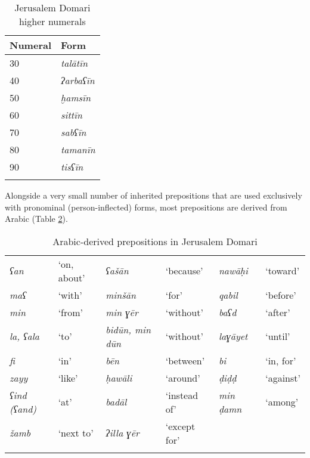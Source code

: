 \documentclass[output=paper]{langsci/langscibook}
\begin{document}
\begin{table}[]
\begin{tabularx}{\textwidth}{XX}
\lsptoprule Numeral & Form\\
\midrule
30 & \textit{talātīn}\\
40 & \textit{ʔarbaʕīn}\\
50 & \textit{ḫamsīn}\\
60 & \textit{sittīn}\\
70 & \textit{sabʕīn}\\
80 & \textit{tamanīn}\\
90 & \textit{tisʕīn}\\
\lspbottomrule
\end{tabularx}
\caption{Jerusalem Domari higher numerals}
\label{numerals2}
\end{table}

Alongside a very small number of inherited prepositions that are used exclusively with pronominal (person-inflected) forms, most prepositions are derived from Arabic (Table \ref{preps}).

\begin{table}[]
\begin{tabularx}{\textwidth}{XXXXXX}
\lsptoprule

\textit{ʕan} & ‘on, about’ & \textit{ʕašān} & ‘because’ & \textit{nawāḥi} & ‘toward’\\
\textit{maʕ} & ‘with’ & \textit{minšān} & ‘for’ & \textit{qabil} & ‘before’\\
\textit{min} & ‘from’ & \textit{min ɣēr} & ‘without’ & \textit{baʕd} & ‘after’\\
\textit{la, ʕala} & ‘to’ & \textit{bidūn, min dūn}  & ‘without’ & \textit{laɣāyet} & ‘until’\\
\textit{fi} & ‘in’ & \textit{bēn} & ‘between’ & \textit{bi} & ‘in, for’\\
\textit{zayy} & ‘like’ & \textit{ḥawāli} & ‘around’ & \textit{ḍiḍḍ} & ‘against’\\
\textit{ʕind (ʕand)} & ‘at’ & \textit{badāl} & ‘instead of’ & \textit{min ḍamn} & ‘among’\\
\textit{žamb} & ‘next to’ & \textit{ʔilla ɣēr} & ‘except for’ &  & \\
\lspbottomrule
\end{tabularx}
  \caption{Arabic-derived prepositions in Jerusalem Domari}
  \label{preps}
  \end{table}
\end{document}
